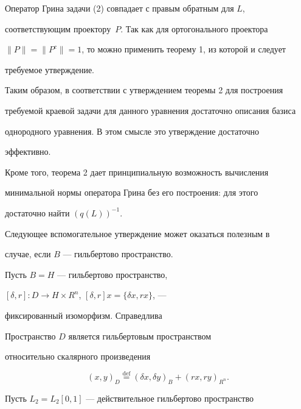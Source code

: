  


Оператор Грина задачи (2) совпадает с правым обратным для $L$,  


соответствующим проектору~$P$. Так как для ортогонального проектора 


$\|P\|=\|P^c\|=1$, то можно применить теорему 1, из которой и следует 


требуемое утверждение. 


 


Таким образом, в соответствии с утверждением теоремы 2 для построения 


требуемой краевой задачи для данного уравнения достаточно описания базиса 


однородного уравнения. В этом смысле это утверждение достаточно 


эффективно.  


Кроме того, теорема 2 дает принципиальную возможность вычисления  


минимальной нормы оператора Грина без его построения: для этого 


достаточно найти $(q(L))^{-1}$. 


 


Следующее вспомогательное утверждение может оказаться полезным в 


случае, если $B$ --- гильбертово пространство. 


 


Пусть $B=H$ --- гильбертово пространство, 


$[\delta,r]:D\to H\times R^n$, $[\delta,r]x=\{\delta x,r x\}$, --- 


фиксированный изоморфизм. Справедлива  


 


\begin{lem} 


Пространство $D$ является гильбертовым пространством  


относительно скалярного произведения 


$$ 


(x,y)_D\overset{\mathrm{def}}{=}{}(\delta x,\delta y)_B+(r x,r y)_{R^n}. 


$$ 


\end{lem} 


 


Пусть $L_2=L_2[0,1]$ --- действительное гильбертово пространство 


